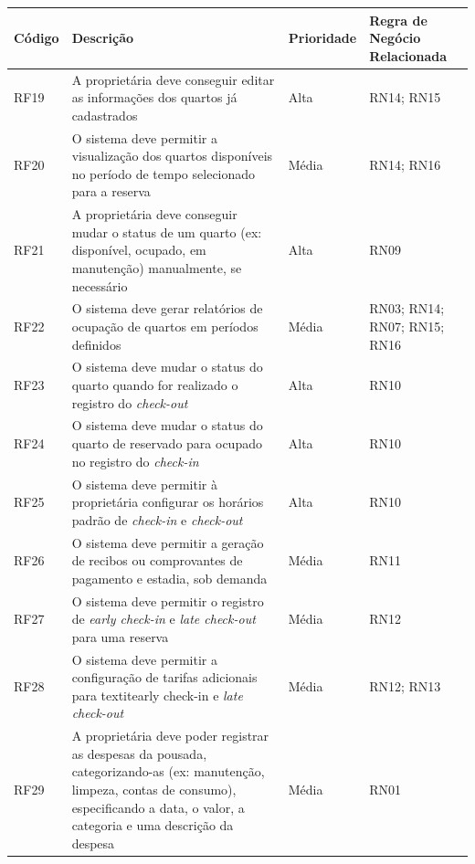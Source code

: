 \documentclass[
	12pt,				%
	openany,			%
	oneside,			%
	a4paper,			%
	english,			%
	french,				%
	spanish,			%
	brazil				%
	]{abntex2}
\begin{document}
\begin{apendicesenv}
\begin{quadro}[H]
	\label{quadro_rfc3}
	\begin{tabular}{|>{\centering\arraybackslash}p{1.5cm}|p{6.7cm}|>{\centering\arraybackslash}p{2cm}|>{\centering\arraybackslash}p{4cm}|}
		\hline
		\textbf{Código} & \textbf{Descrição} & \textbf{Prioridade} & \textbf{Regra de Negócio Relacionada} \\ \hline
		RF19 & A proprietária deve conseguir editar as informações dos quartos já cadastrados & Alta & RN14; RN15
		\\ \hline
		RF20 & O sistema deve permitir a visualização dos quartos disponíveis no período de tempo selecionado para a reserva & Média & RN14; RN16
		 \\ \hline
		RF21 & A proprietária deve conseguir mudar o status de um quarto (ex: disponível, ocupado, em manutenção) manualmente, se necessário & Alta & RN09
		\\ \hline
		RF22 & O sistema deve gerar relatórios de ocupação de quartos em períodos definidos & Média & RN03; RN14; RN07; RN15; RN16
		 \\ \hline
		RF23 & O sistema deve mudar o status do quarto quando for realizado o registro do \textit{check-out} & Alta & RN10
		\\ \hline
		RF24 & O sistema deve mudar o status do quarto de reservado para ocupado no registro do \textit{check-in} & Alta & RN10 
		\\ \hline
		RF25 & O sistema deve permitir à proprietária configurar os horários padrão de \textit{check-in} e \textit{check-out} & Alta & RN10 
		\\ \hline
		RF26 & O sistema deve permitir a geração de recibos ou comprovantes de pagamento e estadia, sob demanda & Média & RN11
		 \\ \hline
		RF27 & O sistema deve permitir o registro de \textit{early check-in} e \textit{late check-out} para uma reserva & Média & RN12 \\ \hline
		RF28 & O sistema deve permitir a configuração de tarifas adicionais para textit{early check-in} e \textit{late check-out} & Média & RN12; RN13
		 \\ \hline
		RF29 & A proprietária deve poder registrar as despesas da pousada, categorizando-as (ex: manutenção, limpeza, contas de consumo), especificando a data, o valor, a categoria e uma descrição da despesa & Média & RN01
		\\ \hline
	\end{tabular}
\end{quadro}


\end{apendicesenv}
\end{document}
